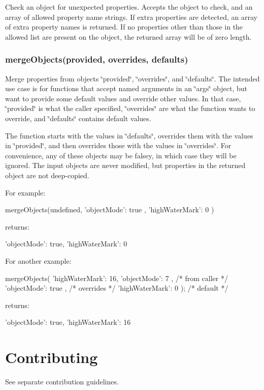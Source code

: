 Check an object for unexpected properties. Accepts the object to check, and an array of allowed property name strings. If extra properties are detected, an array of extra property names is returned. If no properties other than those in the allowed list are present on the object, the returned array will be of zero length.

\subsubsection*{merge\+Objects(provided, overrides, defaults)}

Merge properties from objects \char`\"{}provided\char`\"{}, \char`\"{}overrides\char`\"{}, and \char`\"{}defaults\char`\"{}. The intended use case is for functions that accept named arguments in an \char`\"{}args\char`\"{} object, but want to provide some default values and override other values. In that case, \char`\"{}provided\char`\"{} is what the caller specified, \char`\"{}overrides\char`\"{} are what the function wants to override, and \char`\"{}defaults\char`\"{} contains default values.

The function starts with the values in \char`\"{}defaults\char`\"{}, overrides them with the values in \char`\"{}provided\char`\"{}, and then overrides those with the values in \char`\"{}overrides\char`\"{}. For convenience, any of these objects may be falsey, in which case they will be ignored. The input objects are never modified, but properties in the returned object are not deep-\/copied.

For example\+: \begin{DoxyVerb}mergeObjects(undefined, { 'objectMode': true }, { 'highWaterMark': 0 })
\end{DoxyVerb}


returns\+: \begin{DoxyVerb}{ 'objectMode': true, 'highWaterMark': 0 }
\end{DoxyVerb}


For another example\+: \begin{DoxyVerb}mergeObjects(
    { 'highWaterMark': 16, 'objectMode': 7 }, /* from caller */
    { 'objectMode': true },                   /* overrides */
    { 'highWaterMark': 0 });                  /* default */
\end{DoxyVerb}


returns\+: \begin{DoxyVerb}{ 'objectMode': true, 'highWaterMark': 16 }
\end{DoxyVerb}


\section*{Contributing}

See separate contribution guidelines. 